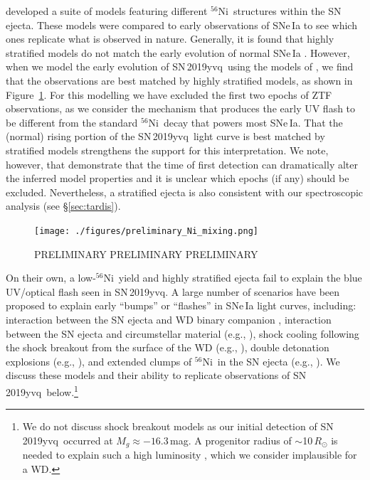 \documentclass[twocolumn]{aastex63}
\newcommand{\radni}{$^{56}$Ni}
\newcommand{\sn}{SN\,2019yvq}
\begin{document}
\citet{Magee20} developed a suite of models featuring different \radni\
structures within the SN ejecta. These models were compared to early
observations of SNe\,Ia to see which ones replicate what is observed in
nature. Generally, it is found that highly stratified models do not match the
early evolution of normal SNe\,Ia \citep{Magee20}. However, when we model the
early evolution of \sn\ using the models of \citet{Magee20}, we find that the
observations are best matched by highly stratified models, as shown in
Figure~\ref{fig:Ni_mixing}. For this modelling we have excluded the first two
epochs of ZTF observations, as we consider the mechanism that produces the
early UV flash to be different from the standard \radni\ decay that powers
most SNe\,Ia. That the (normal) rising portion of the \sn\ light curve is best
matched by stratified models strengthens the support for this interpretation.
We note, however, that \citet{Magee20} demonstrate that the time of first
detection can dramatically alter the inferred model properties and it is
unclear which epochs (if any) should be excluded. Nevertheless, a stratified
ejecta is also consistent with our spectroscopic analysis (see
\S\ref{sec:tardis}).

\begin{figure}
    \centering
    \texttt{[image: ./figures/preliminary\_Ni\_mixing.png]}
    \caption{PRELIMINARY PRELIMINARY PRELIMINARY}
    \label{fig:Ni_mixing}
\end{figure}

On their own, a low-\radni\ yield and highly stratified ejecta fail to explain
the blue UV/optical flash seen in \sn. A large number of scenarios have been
proposed to explain early ``bumps'' or ``flashes'' in SNe\,Ia light curves,
including: interaction between the SN ejecta and WD binary
companion \citep{Kasen10a}, interaction between the SN ejecta and
circumstellar material (e.g., \citealt{Dessart14,Piro16}), shock cooling
following the shock breakout from the surface of the WD (e.g.,
\citealt{Piro10,Rabinak11}), double detonation explosions (e.g.,
\citealt{Noebauer17,Polin19}), and extended clumps of \radni\ in the SN ejecta
(e.g., \citealt{Shappee19,Dimitriadis19}). We discuss these models and their
ability to replicate observations of \sn\ below.\footnote{We do not discuss
shock breakout models as our initial detection of \sn\ occurred at $M_g
\approx -16.3$\,mag. A progenitor radius of $\sim$10$\,R_\odot$ is needed to
explain such a high luminosity \citep{Piro10,Rabinak11}, which we consider
implausible for a WD.}
\end{document}
